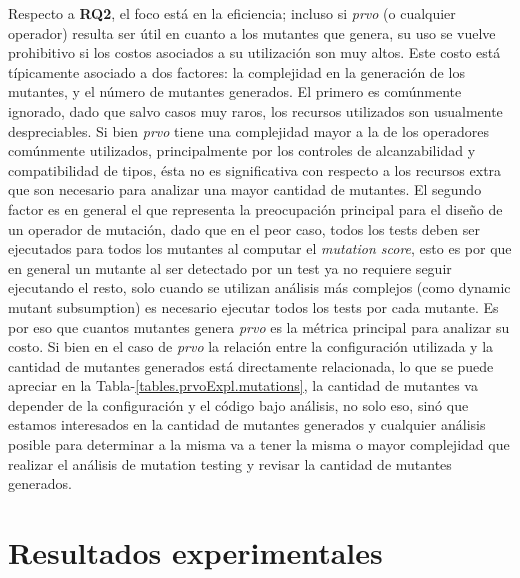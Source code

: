 Respecto a \textbf{RQ2}, el foco est\'a en la eficiencia; incluso si \emph{prvo} (o cualquier operador) resulta ser \'util en cuanto a los mutantes que genera, su uso se vuelve prohibitivo si los costos asociados a su utilizaci\'on son muy altos. Este costo est\'a t\'ipicamente asociado a dos factores: la complejidad en la generaci\'on de los mutantes, y el n\'umero de mutantes generados. El primero es com\'unmente ignorado, dado que salvo casos muy raros, los recursos utilizados son usualmente despreciables. Si bien \emph{prvo} tiene una complejidad mayor a la de los operadores com\'unmente utilizados, principalmente por los controles de alcanzabilidad y compatibilidad de tipos, \'esta no es significativa con respecto a los recursos extra que son necesario para analizar una mayor cantidad de mutantes. El segundo factor es en general el que representa la preocupaci\'on principal para el dise\~no de un operador de mutaci\'on, dado que en el peor caso, todos los tests deben ser ejecutados para todos los mutantes al computar el \emph{mutation score}, esto es por que en general un mutante al ser detectado por un test ya no requiere seguir ejecutando el resto, solo cuando se utilizan an\'alisis m\'as complejos (como dynamic mutant subsumption) es necesario ejecutar todos los tests por cada mutante. Es por eso que cuantos mutantes genera \emph{prvo} es la m\'etrica principal para analizar su costo. Si bien en el caso de \emph{prvo} la relaci\'on entre la configuraci\'on utilizada y la cantidad de mutantes generados est\'a directamente relacionada, lo que se puede apreciar en la Tabla-\ref{tables.prvoExpl.mutations}, la cantidad de mutantes va depender de la configuraci\'on y el c\'odigo bajo an\'alisis, no solo eso, sin\'o que estamos interesados en la cantidad de mutantes generados y cualquier an\'alisis posible para determinar a la misma va a tener la misma o mayor complejidad que realizar el an\'alisis de mutation testing y revisar la cantidad de mutantes generados.


\section{Resultados experimentales}
\label{sec:evaluation.results}

